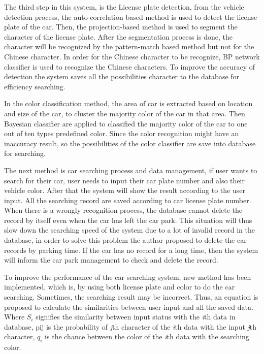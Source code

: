 \documentclass[12pt]{article}
\begin{document}
The third step in this system, is the License plate detection, from the vehicle detection process, the auto-correlation based method \cite{acbm}is used to detect the license plate of the car. Then, the projection-based method is used to segment the character of the license plate.\cite{segment} After the segmentation process is done, the character will be recognized by the pattern-match based method but not for the Chinese character. In order for the Chinese character to be recognize, BP network classifier is used to recognize the Chinese characters. To improve the accuracy of detection the system saves all the possibilities character to the database for efficiency searching.

In the color classification method, the area of car is extracted based on location and size of the car, to cluster the majority color of the car in that area. Then Bayesian classifier are applied to classified the majority color of the car to one out of ten types predefined color. Since the color recognition might have an inaccuracy result, so the possibilities of the color classifier are save into database for searching.

The next method is car searching process and data management, if user wants to search for their car, user needs to input their car plate number and also their vehicle color. After that the system will show the result according to the user input. All the searching record are saved according to car license plate number. When there is a wrongly recognition process, the database cannot delete the record by itself even when the car has left the car park. This situation will thus slow down the searching speed of the system due to a lot of invalid record in the database, in order to solve this problem the author proposed to delete the car records by parking time. If the car has no record for a long time, then the system will inform the car park management to check and delete the record.

To improve the performance of the car searching system, new method has been implemented, which is, by using both license plate and color to do the car searching. Sometimes, the searching result may be incorrect. Thus, an equation is proposed to calculate the similarities between user input and all the saved data. Where $S_i$ signifies the similarity between input status with the \textit{i}th data in database, p{ij} is the probability of \textit{j}th character of the \textit{i}th data with the input \textit{j}th character, $q_i$ is the chance between the color of the \textit{i}th data with the searching color. 
\end{document}
